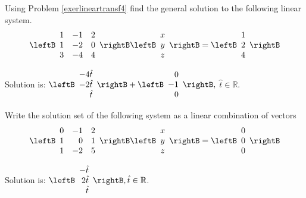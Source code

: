 \begin{enumialphparenastyle}
\begin{ex} Using Problem \ref{exerlineartransf4} find the general solution to the
following linear system. 
\begin{equation*}
\leftB
\begin{array}{rrr}
1 & -1 & 2 \\
1 & -2 & 0 \\
3 & -4 & 4
\end{array}
\rightB \leftB
\begin{array}{c}
x \\
y \\
z
\end{array}
\rightB =\leftB
\begin{array}{r}
1 \\
2 \\
4
\end{array}
\rightB 
\end{equation*}
\begin{sol}
Solution is: $\leftB
\begin{array}{r}
-4\hat{t} \\
-2\hat{t} \\
\hat{t}
\end{array}
\rightB +\leftB
\begin{array}{r}
0 \\
-1 \\
0
\end{array}
\rightB ,$ $\hat{t}\in \mathbb{R}$.
\end{sol}
\end{ex}

\begin{ex} \label{exerlineartransf5}Write the solution set of the following system as a linear combination of vectors 
\begin{equation*}
\leftB
\begin{array}{rrr}
0 & -1 & 2 \\
1 & 0 & 1 \\
1 & -2 & 5
\end{array}
\rightB \leftB
\begin{array}{c}
x \\
y \\
z
\end{array}
\rightB =\leftB
\begin{array}{c}
0 \\
0 \\
0
\end{array}
\rightB 
\end{equation*}
\begin{sol}
Solution is: $\leftB
\begin{array}{r}
-\hat{t} \\
2\hat{t} \\
\hat{t}
\end{array}
\rightB ,\hat{t}\in \mathbb{R}$.
\end{sol}
\end{ex}


\end{enumialphparenastyle}
